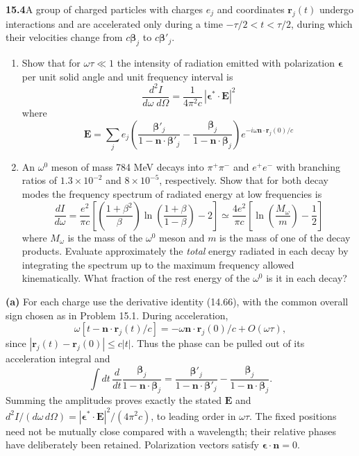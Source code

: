 \par\bigskip
\noindent\textbf{15.4}\quad A group of charged particles with charges $e_{j}$ and coordinates $\mathbf{r}_{j}(t)$ undergo interactions and are accelerated only during a time $-\tau/2<t<\tau/2$, during which their velocities change from $c\boldsymbol{\beta}_{j}$ to $c\boldsymbol{\beta}'_{j}$.
\begin{enumerate}
\item[(a)] Show that for $\omega\tau\ll1$ the intensity of radiation emitted with polarization $\boldsymbol{\epsilon}$ per unit solid angle and unit frequency interval is
\[
\frac{d^{2}I}{d\omega\;d\Omega}=\frac{1}{4\pi^{2}c}\,|\boldsymbol{\epsilon}^{*}\cdot\mathbf{E}|^{2}
\]
where
\[
\mathbf{E}=\sum_{j}e_{j}\!\left(\frac{\boldsymbol{\beta}'_{j}}{1-\mathbf{n}\cdot\boldsymbol{\beta}'_{j}}-\frac{\boldsymbol{\beta}_{j}}{1-\mathbf{n}\cdot\boldsymbol{\beta}_{j}}\right)\!e^{-i\omega\mathbf{n}\cdot\mathbf{r}_{j}(0)/c}
\]
\item[(b)] An $\omega^{0}$ meson of mass 784 MeV decays into $\pi^{+}\pi^{-}$ and $e^{+}e^{-}$ with branching ratios of $1.3\times10^{-2}$ and $8\times10^{-5}$, respectively. Show that for both decay modes the frequency spectrum of radiated energy at low frequencies is
\[
\frac{dI}{d\omega}=\frac{e^{2}}{\pi c}\left[\left(\frac{1+\beta^{2}}{\beta}\right)\ln\!\left(\frac{1+\beta}{1-\beta}\right)-2\right]\simeq\frac{4e^{2}}{\pi c}\left[\ln\!\left(\frac{M_{\omega}}{m}\right)-\frac{1}{2}\right]
\]
where $M_{\omega}$ is the mass of the $\omega^{0}$ meson and $m$ is the mass of one of the decay products. Evaluate approximately the \emph{total} energy radiated in each decay by integrating the spectrum up to the maximum frequency allowed kinematically. What fraction of the rest energy of the $\omega^{0}$ is it in each decay?
\end{enumerate}
\solution

\medskip\noindent\textbf{(a)} For each charge use the derivative
identity (14.66), with the common overall sign chosen as in
Problem 15.1.  During acceleration,
\[
\omega[t-\mathbf n\cdot\mathbf r_j(t)/c]
=-\omega\mathbf n\cdot\mathbf r_j(0)/c+O(\omega\tau),
\]
since $|\mathbf r_j(t)-\mathbf r_j(0)|\leq c|t|$.
Thus the phase can be pulled out of its acceleration integral and
\[
\int dt\,\frac d{dt}\frac{\boldsymbol\beta_j}
 {1-\mathbf n\cdot\boldsymbol\beta_j}
=\frac{\boldsymbol\beta'_j}{1-\mathbf n\cdot\boldsymbol\beta'_j}
 -\frac{\boldsymbol\beta_j}{1-\mathbf n\cdot\boldsymbol\beta_j}.
\]
Summing the amplitudes proves exactly the stated $\mathbf E$ and
$d^2I/(d\omega\,d\Omega)=|\boldsymbol\epsilon^*\cdot\mathbf E|^2/
(4\pi^2c)$, to leading order in $\omega\tau$.  The fixed positions
need not be mutually close compared with a wavelength; their relative
phases have deliberately been retained.  Polarization vectors satisfy
$\boldsymbol\epsilon\cdot\mathbf n=0$.

